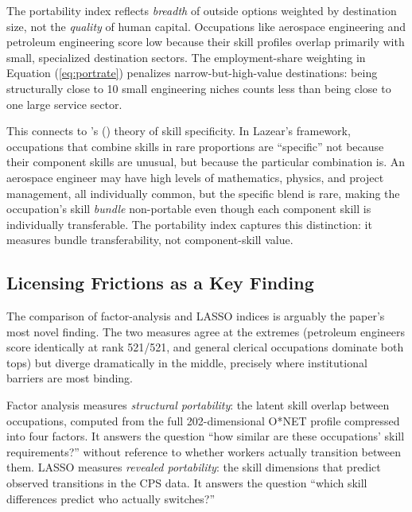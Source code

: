 \documentclass[12pt]{article}
\begin{document}
The portability index reflects \emph{breadth} of outside options weighted by destination size, not the \emph{quality} of human capital. Occupations like aerospace engineering and petroleum engineering score low because their skill profiles overlap primarily with small, specialized destination sectors. The employment-share weighting in Equation (\ref{eq:portrate}) penalizes narrow-but-high-value destinations: being structurally close to 10 small engineering niches counts less than being close to one large service sector.

This connects to \citeauthor{lazear2009}'s (\citeyear{lazear2009}) theory of skill specificity. In Lazear's framework, occupations that combine skills in rare proportions are ``specific'' not because their component skills are unusual, but because the particular combination is. An aerospace engineer may have high levels of mathematics, physics, and project management, all individually common, but the specific blend is rare, making the occupation's skill \emph{bundle} non-portable even though each component skill is individually transferable. The portability index captures this distinction: it measures bundle transferability, not component-skill value.

\subsection{Licensing Frictions as a Key Finding}

The comparison of factor-analysis and LASSO indices is arguably the paper's most novel finding. The two measures agree at the extremes (petroleum engineers score identically at rank 521/521, and general clerical occupations dominate both tops) but diverge dramatically in the middle, precisely where institutional barriers are most binding.

Factor analysis measures \emph{structural portability}: the latent skill overlap between occupations, computed from the full 202-dimensional O*NET profile compressed into four factors. It answers the question ``how similar are these occupations' skill requirements?'' without reference to whether workers actually transition between them. LASSO measures \emph{revealed portability}: the skill dimensions that predict observed transitions in the CPS data. It answers the question ``which skill differences predict who actually switches?''
\end{document}
